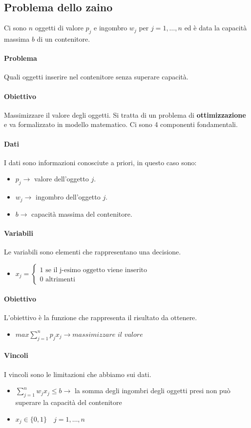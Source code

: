 \documentclass[12pt, twoside, letterpaper]{article}
\newcommand{\problema}[5]{
	#1
	\begin{dati}
		\paragraph{Dati} #2
	\end{dati}
	\begin{variabili}
		\paragraph{Variabili} #3
	\end{variabili}
	\begin{obiettivo}
		\paragraph{Obiettivo} #4
	\end{obiettivo}
	\begin{vincoli}
		\paragraph{Vincoli} #5
	\end{vincoli}
}
\begin{document}
		\subsection{Problema dello zaino} 
				\problema{
					Ci sono $n$ oggetti di valore $p_j$ e ingombro $w_j$ per $j=1, \dots, n$ ed è data la capacità massima $b$ di un contenitore.
			\paragraph{Problema} Quali oggetti inserire nel contenitore senza superare capacità. 
			\paragraph{Obiettivo}Massimizzare il valore degli oggetti. Si tratta di un problema di \textbf{ottimizzazione} e va formalizzato in modello matematico. Ci sono 4 componenti fondamentali.}
				{I dati sono informazioni conosciute a priori, in questo caso sono:
				\begin{itemize}
					\item $p_j \rightarrow$ valore dell'oggetto $j$.
					\item $w_j \rightarrow$ ingombro dell'oggetto $j$.
					\item $b \rightarrow$ capacità massima del contenitore.
				\end{itemize}}
				{Le variabili sono elementi che rappresentano una decisione. 
				\begin{itemize}
					\item $x_j= \begin{cases} \text{1 se il j-esimo oggetto viene inserito} \\ \text{0 altrimenti}\end{cases}$
				\end{itemize}}
				{L'obiettivo è la funzione che rappresenta il risultato da ottenere.
				\begin{itemize}
					\item $max \sum_{j=1}^np_jx_j \rightarrow \textit{massimizzare il valore}$
				\end{itemize}				  }
				{I vincoli sono le limitazioni che abbiamo sui dati. 
				\begin{itemize}
					\item $\sum_{j=1}^n w_j x_j \leq b \rightarrow$ la somma degli ingombri degli oggetti presi non può superare la capacità del contenitore 
					 \item $x_j \in \{0,1\} \quad j=1, \dots, n$
				\end{itemize}}
		
\end{document}
